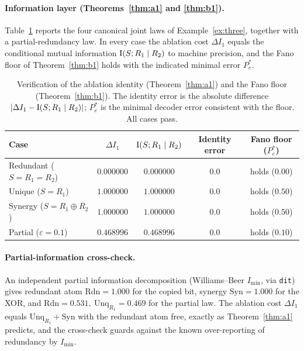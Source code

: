 \paragraph{Information layer (Theorems~\ref{thm:a1} and \ref{thm:b1}).}
Table~\ref{tab:info} reports the four canonical joint laws of
Example~\ref{ex:three}, together with a partial-redundancy law. In every case the
ablation cost $\Delta I_1$ equals the conditional mutual information
$\operatorname{I}(S;R_1\mid R_2)$ to machine precision, and the Fano floor of
Theorem~\ref{thm:b1} holds with the indicated minimal error $P_e^\ast$.

\begin{table}[ht]
\centering
\caption{Verification of the ablation identity (Theorem~\ref{thm:a1}) and the Fano
floor (Theorem~\ref{thm:b1}). The identity error is the absolute difference
$\lvert\Delta I_1-\operatorname{I}(S;R_1\mid R_2)\rvert$; $P_e^\ast$ is the minimal decoder error
consistent with the floor. All cases pass.}
\label{tab:info}
\begin{tabular}{lcccc}
\toprule
Case & $\Delta I_1$ & $\operatorname{I}(S;R_1\mid R_2)$ & Identity error & Fano floor ($P_e^\ast$) \\
\midrule
Redundant ($S=R_1=R_2$)   & $0.000000$ & $0.000000$ & $0.0$ & holds ($0.00$) \\
Unique ($S=R_1$)          & $1.000000$ & $1.000000$ & $0.0$ & holds ($0.50$) \\
Synergy ($S=R_1\oplus R_2$) & $1.000000$ & $1.000000$ & $0.0$ & holds ($0.50$) \\
Partial ($\varepsilon=0.1$) & $0.468996$ & $0.468996$ & $0.0$ & holds ($0.10$) \\
\bottomrule
\end{tabular}
\end{table}

\paragraph{Partial-information cross-check.}
An independent partial information decomposition (Williams--Beer $I_{\min}$, via
\texttt{dit}) gives redundant atom $\mathrm{Rdn}=1.000$ for the copied bit,
synergy $\mathrm{Syn}=1.000$ for the XOR, and
$\mathrm{Rdn}=0.531,\ \mathrm{Unq}_{R_1}=0.469$ for the partial law. The ablation cost
$\Delta I_1$ equals $\mathrm{Unq}_{R_1}+\mathrm{Syn}$ with the redundant atom free,
exactly as Theorem~\ref{thm:a1} predicts, and the cross-check guards against the
known over-reporting of redundancy by $I_{\min}$.


